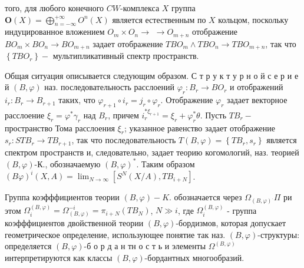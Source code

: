 \documentclass[10pt]{article}
\begin{document}
того, для любого конечного $C W$-комплекса $X$ группа $\boldsymbol{O}(X)=\bigoplus_{n=-\infty}^{+\infty} O^{n}(X)$ является естественным по $X$ кольцом, поскольку индуцированное вложением $O_{m} \times O_{n} \rightarrow$ $\rightarrow O_{m+n}$ отображение $B O_{m} \times B O_{n} \rightarrow B O_{m+n}$ задает отображение $T B O_{m} \wedge T B O_{n} \rightarrow T B O_{m+n}$, так что $\left\{T B O_{r}\right\}-$ мультипликативный спектр пространств.



Общая ситуация описывается следующим образом. С т р у к т у р н о й с е р и е й $(B, \varphi)$ наз. последовательность расслоений $\varphi_{r}: B_{r} \rightarrow B O_{r}$ и отображений $i_{r}: B_{r} \rightarrow B_{r+1}$ таких, что $\varphi_{r+1} \circ i_{r}=j_{r} \circ \varphi_{r}$. Отображение $\varphi_{r}$ задает векторное расслоение $\xi_{r}=\varphi^{*} \gamma_{r}$ над $B_{r}$, причем $i_{r}^{* \xi_{r+1}}=\xi_{r}+\varphi_{r}^{*} \theta$. Пусть $T B_{r}-$ пространство Тома расслоения $\xi_{r}$; указанное равенство задает отображение $s_{r}: S T B_{r} \rightarrow T B_{r+1}$, так что последовательность $T(B, \varphi)=\left\{T B_{r}, s_{r}\right\}$ является спектром пространств и, следовательно, задает теорию когомологий, наз. теорией $(B, \varphi)$-К., обозначаемую $(B, \varphi)^{*}$. Таким образом $(B \varphi)^{i}(X, A)=\lim _{N \rightarrow \infty}\left[S^{N}(X / A), T B_{i+N}\right]$.



Группа коэфффициентов теории $(B, \varphi)-K$. обозначается через $\Omega_{(B, \varphi)^{.}} \Pi$ ри этом $\Omega_{i}^{(B, \varphi)}=\Omega_{(B, \varphi)}^{-i}=\pi_{i+N}\left(T B_{N}\right)$, $N \gg i$, где $\Omega_{i}^{(B, \varphi)}$ - группа коэфффициентов двойственной теории $(B, \varphi)$-бордизмов, которая допускает геометрическое определение, использующее понятие так наз. $(B, \varphi)$-структуры: определяется $(B, \varphi)$-б о р д а н тн о с т ь и элементы $\Omega^{(B, \varphi)}$ интерпретируются как классы $(B, \varphi)$-бордантных многообразий.
\end{document}
